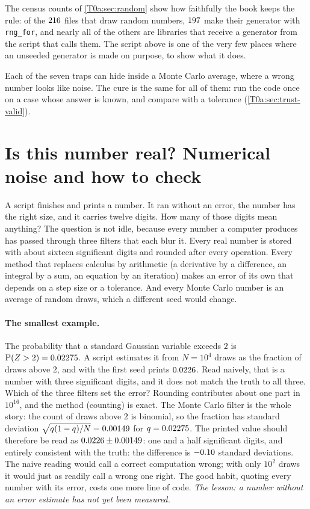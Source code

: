 The census counts of \cref{T0a:sec:random} show how faithfully the book keeps the rule: of the $216$ files that draw random numbers, $197$ make their generator with \texttt{rng\_for}, and nearly all of the others are libraries that receive a generator from the script that calls them. The script above is one of the very few places where an unseeded generator is made on purpose, to show what it does.

\begin{pitfall}
Each of the seven traps can hide inside a Monte Carlo average, where a wrong number looks like noise. The cure is the same for all of them: run the code once on a case whose answer is known, and compare with a tolerance (\cref{T0a:sec:trust-valid}).
\end{pitfall}
\providecommand{\TzZcv}{\pgfmathparse{(\SBvrTwo-1)/\SBerrTwo}\pgfmathprintnumber[fixed,precision=1]{\pgfmathresult}}

\section{Is this number real? Numerical noise and how to check}
\label{T0a:sec:trust}

A script finishes and prints a number. It ran without an error, the number has the right size, and it carries twelve digits. How many of those digits mean anything? The question is not idle, because every number a computer produces has passed through three filters that each blur it. Every real number is stored with about sixteen significant digits and rounded after every operation. Every method that replaces calculus by arithmetic (a derivative by a difference, an integral by a sum, an equation by an iteration) makes an error of its own that depends on a step size or a tolerance. And every Monte Carlo number is an average of random draws, which a different seed would change.

\paragraph{The smallest example.} The probability that a standard Gaussian variable exceeds $2$ is $\operatorname{P}(Z>2)=0.02275$. A script estimates it from $N=10^4$ draws as the fraction of draws above $2$, and with the first seed prints $0.0226$. Read naively, that is a number with three significant digits, and it does not match the truth to all three. Which of the three filters set the error? Rounding contributes about one part in $10^{16}$, and the method (counting) is exact. The Monte Carlo filter is the whole story: the count of draws above $2$ is binomial, so the fraction has standard deviation $\sqrt{q(1-q)/N}=0.00149$ for $q=0.02275$. The printed value should therefore be read as $0.0226\pm0.00149$: one and a half significant digits, and entirely consistent with the truth: the difference is $-0.10$ standard deviations. The naive reading would call a correct computation wrong; with only $10^2$ draws it would just as readily call a wrong one right. The good habit, quoting every number with its error, costs one more line of code. \emph{The lesson: a number without an error estimate has not yet been measured.}

